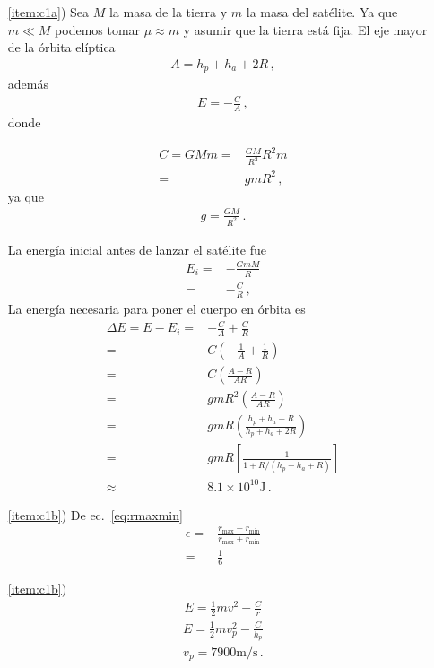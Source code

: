 \begin{itemize}
\item[\ref{item:c1a})] Sea $M$ la masa de la tierra y $m$ la masa
  del satélite. Ya que $m\ll M$ podemos tomar $\mu\approx m$ y
  asumir que la tierra está fija. El eje mayor de la órbita elíptica
  \begin{align*}
    A=h_p+h_a+2R\,,
  \end{align*}
  además   
  \begin{align*}
    E=-\frac{C}{A}\,,
  \end{align*}
  donde

  \begin{align*}
    C=GMm=&\frac{GM}{R^2}R^2 m\nonumber\\
    =&g m R^2\,,
  \end{align*}
  ya que
  \begin{align*}
    g=\frac{GM}{R^2}\,.
  \end{align*}

  La energía inicial antes de lanzar el satélite fue
  \begin{align*}
    E_i=&-\frac{GmM}{R}\nonumber\\
    =&-\frac{C}{R}\,,
  \end{align*}
  La energía necesaria para poner el cuerpo en órbita es
  \begin{align*}
    \Delta E=E-E_i=&-\frac{C}{A}+\frac{C}{R}\nonumber\\
    =&C\left( -\frac{1}{A}+\frac{1}{R}     \right)\nonumber\\
    =&C\left( \frac{A-R}{AR}     \right)\nonumber\\
    =&g m R^2\left( \frac{A-R}{AR}     \right)\nonumber\\
    =&g m R\left( \frac{h_p+h_a+R}{h_p+h_a+2R}     \right)\nonumber\\
    =&g m R\left[ \frac{1}{1+R/(h_p+h_a+R)}     \right]\nonumber\\
    \approx&8.1\times 10^{10}\si{\joule}\,.
  \end{align*}
 \item[\ref{item:c1b})] De ec.~\eqref{eq:rmaxmin}
   \begin{align*}
     \epsilon=&\frac{r_{\text{max}}-r_{\text{min}}}{r_{\text{max}}+r_{\text{min}}}\nonumber\\
     =&\frac{1}{6}
   \end{align*}
 \item[\ref{item:c1b})]
   \begin{align*}
     E=\frac{1}{2}mv^2-\frac{C}{r}
   \end{align*}
   \begin{align*}
     E=\frac{1}{2}mv_p^2-\frac{C}{h_p}
   \end{align*}
   \begin{align*}
     v_p=7900\si{\meter\per\second}\,.
   \end{align*}
  \end{itemize}



\begin{extrapage}
  \newpage
  \qquad
  \newpage
\end{extrapage}



